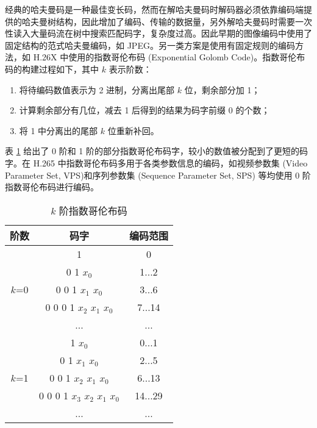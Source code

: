 经典的哈夫曼码是一种最佳变长码，然而在解哈夫曼码时解码器必须依靠编码端提供的哈夫曼树结构，因此增加了编码、传输的数据量，另外解哈夫曼码时需要一次性读入大量码流在树中搜索匹配码字，复杂度过高。因此早期的图像编码中使用了固定结构的范式哈夫曼编码，如 JPEG。另一类方案是使用有固定规则的编码方法，如 H.26X 中使用的指数哥伦布码 (Exponential Golomb Code)。指数哥伦布码的构建过程如下，其中 $k$ 表示阶数：
\begin{enumerate}
    \item 将待编码数值表示为 2 进制，分离出尾部 $k$ 位，剩余部分加 1；
    \item 计算剩余部分有几位，减去 1 后得到的结果为码字前缀 0 的个数；
    \item 将 1 中分离出的尾部 $k$ 位重新补回。
\end{enumerate}
表 \ref{tab:ExpColombCode} 给出了 0 阶和 1 阶的部分指数哥伦布码字，较小的数值被分配到了更短的码字。在 H.265 中指数哥伦布码多用于各类参数信息的编码，如视频参数集 (Video Parameter Set, VPS)和序列参数集 (Sequence Parameter Set, SPS) 等均使用 0 阶指数哥伦布码进行编码。
\begin{table}[hbtp]
    \centering
    \caption{$k$ 阶指数哥伦布码}
    \label{tab:ExpColombCode}
    \begin{tabular}{@{}ccc@{}}
        \toprule
        \textbf{阶数}          & \textbf{码字}                     & \textbf{编码范围} \\ \midrule
        \multirow{5}{*}{$k$=0} & 1                                 & 0                 \\
                               & 0 1 $x_0$                         & 1...2             \\
                               & 0 0 1 $x_1$ $x_0$                 & 3...6             \\
                               & 0 0 0 1 $x_2$ $x_1$ $x_0$         & 7...14            \\
                               & ...                               & ...               \\
        \multirow{5}{*}{$k$=1} & 1 $x_0$                           & 0...1             \\
                               & 0 1 $x_1$ $x_0$                   & 2...5             \\
                               & 0 0 1 $x_2$ $x_1$ $x_0$           & 6...13            \\
                               & 0 0 0 1 $x_3$ $x_2$ $x_1$   $x_0$ & 14...29           \\
                               & ...                               & ...               \\ \bottomrule
    \end{tabular}
\end{table}

